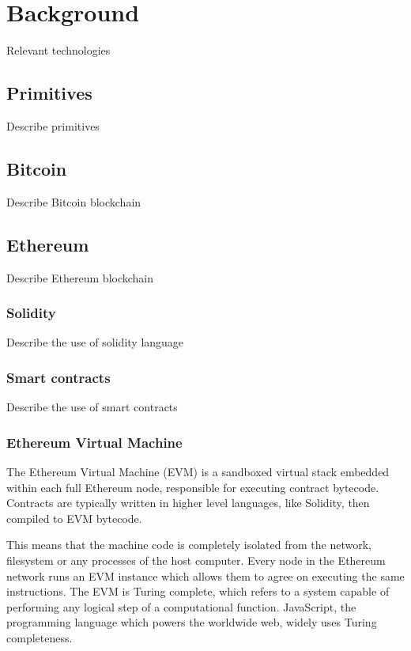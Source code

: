 \chapter{Background}

Relevant technologies

\section{Primitives}

Describe primitives

\section{Bitcoin}

Describe Bitcoin blockchain

\section{Ethereum}

Describe Ethereum blockchain

\subsection{Solidity}

Describe the use of solidity language

\subsection{Smart contracts}

Describe the use of smart contracts

\subsection{Ethereum Virtual Machine}

The Ethereum Virtual Machine (EVM) is a sandboxed virtual stack
embedded within each full Ethereum node, responsible for executing
contract bytecode. Contracts are typically written in higher level
languages, like Solidity, then compiled to EVM bytecode.

This means that the machine code is completely isolated from the
network, filesystem or any processes of the host computer. Every node
in the Ethereum network runs an EVM instance which allows them to
agree on executing the same instructions. The EVM is Turing complete,
which refers to a system capable of performing any logical step of a
computational function. JavaScript, the programming language which
powers the worldwide web, widely uses Turing completeness.

